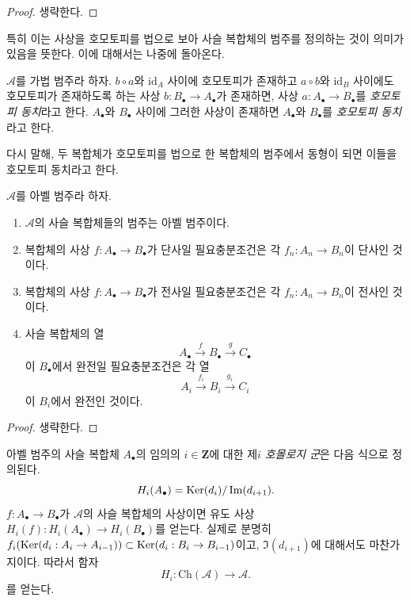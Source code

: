 \begin{proof}
생략한다.
\end{proof}

\noindent
특히 이는 사상을 호모토피를 법으로 보아 사슬 복합체의 범주를
정의하는 것이 의미가 있음을 뜻한다. 이에 대해서는 나중에 돌아온다.

\begin{definition}
\label{definition-homotopy-equivalent}
$\mathcal{A}$를 가법 범주라 하자.
$b \circ a$와 $\text{id}_A$ 사이에 호모토피가 존재하고
$a \circ b$와 $\text{id}_B$ 사이에도 호모토피가 존재하도록 하는
사상 $b : B_\bullet \to A_\bullet$가 존재하면, 사상
$a : A_\bullet \to B_\bullet$를 {\it 호모토피 동치}라고 한다.
$A_\bullet$와 $B_\bullet$ 사이에 그러한 사상이 존재하면
$A_\bullet$와 $B_\bullet$를 {\it 호모토피 동치}라고 한다.
\end{definition}

\noindent
다시 말해, 두 복합체가 호모토피를 법으로 한 복합체의 범주에서
동형이 되면 이들을 호모토피 동치라고 한다.

\begin{lemma}
\label{lemma-cat-chain-abelian}
$\mathcal{A}$를 아벨 범주라 하자.
\begin{enumerate}
\item $\mathcal{A}$의 사슬 복합체들의 범주는 아벨 범주이다.
\item 복합체의 사상 $f : A_\bullet \to B_\bullet$가 단사일
필요충분조건은 각 $f_n : A_n \to B_n$이 단사인 것이다.
\item 복합체의 사상 $f : A_\bullet \to B_\bullet$가 전사일
필요충분조건은 각 $f_n : A_n \to B_n$이 전사인 것이다.
\item 사슬 복합체의 열
$$
A_\bullet \xrightarrow{f} B_\bullet \xrightarrow{g} C_\bullet
$$
이 $B_\bullet$에서 완전일 필요충분조건은 각 열
$$
A_i \xrightarrow{f_i} B_i \xrightarrow{g_i} C_i
$$
이 $B_i$에서 완전인 것이다.
\end{enumerate}
\end{lemma}

\begin{proof}
생략한다.
\end{proof}

\noindent
아벨 범주의 사슬 복합체 $A_\bullet$의 임의의
$i \in \mathbf{Z}$에 대한 제$i$ {\it 호몰로지 군}은 다음 식으로
정의된다.
$$
H_i(A_\bullet) = \mathop{\mathrm{Ker}}(d_i)/\mathop{\mathrm{Im}}(d_{i + 1}).
$$
$f : A_\bullet \to B_\bullet$가 $\mathcal{A}$의 사슬 복합체의
사상이면 유도 사상 $H_i(f) : H_i(A_\bullet) \to H_i(B_\bullet)$를
얻는다. 실제로 분명히
$f_i(\mathop{\mathrm{Ker}}(d_i : A_i \to A_{i - 1})) \subset
\mathop{\mathrm{Ker}}(d_i : B_i \to B_{i - 1})$이고, $\Im(d_{i + 1})$에 대해서도
마찬가지이다. 따라서 함자
$$
H_i : \text{Ch}(\mathcal{A}) \longrightarrow \mathcal{A}.
$$
를 얻는다.

